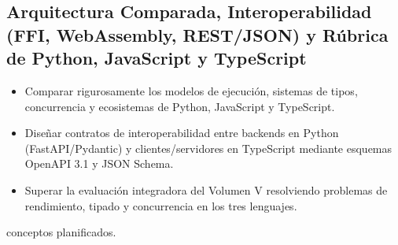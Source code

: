 \documentclass{book}
\begin{document}
\subsection*{\checkmark Arquitectura Comparada, Interoperabilidad (FFI, WebAssembly, REST/JSON) y Rúbrica de Python, JavaScript y TypeScript}
\begin{itemize}
\item Comparar rigurosamente los modelos de ejecución, sistemas de tipos, concurrencia y ecosistemas de Python, JavaScript y TypeScript.
\item Diseñar contratos de interoperabilidad entre backends en Python (FastAPI/Pydantic) y clientes/servidores en TypeScript mediante esquemas OpenAPI 3.1 y JSON Schema.
\item Superar la evaluación integradora del Volumen V resolviendo problemas de rendimiento, tipado y concurrencia en los tres lenguajes.
\end{itemize}
 conceptos planificados.
\backmatter
\end{document}

